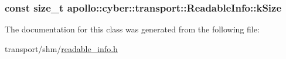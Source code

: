 \hypertarget{classapollo_1_1cyber_1_1transport_1_1ReadableInfo_a4a104484fb37781746fb29e2e597007c}{
\subsubsection[{k\-Size}]{\setlength{\rightskip}{0pt plus 5cm}const size\-\_\-t apollo\-::cyber\-::transport\-::\-Readable\-Info\-::k\-Size\hspace{0.3cm}{\ttfamily [static]}}}\label{classapollo_1_1cyber_1_1transport_1_1ReadableInfo_a4a104484fb37781746fb29e2e597007c}


The documentation for this class was generated from the following file\-:\begin{DoxyCompactItemize}
\item 
transport/shm/\hyperlink{readable__info_8h}{readable\-\_\-info.\-h}\end{DoxyCompactItemize}
